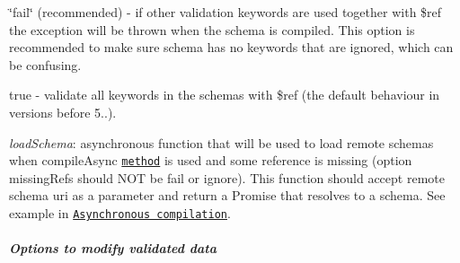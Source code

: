 \begin{DoxyItemize}
\begin{DoxyItemize}
\item {\ttfamily \char`\"{}fail\char`\"{}} (recommended) -\/ if other validation keywords are used together with {\ttfamily \$ref} the exception will be thrown when the schema is compiled. This option is recommended to make sure schema has no keywords that are ignored, which can be confusing.
\item {\ttfamily true} -\/ validate all keywords in the schemas with {\ttfamily \$ref} (the default behaviour in versions before 5..).
\end{DoxyItemize}
\item {\itshape load\+Schema}\+: asynchronous function that will be used to load remote schemas when {\ttfamily compile\+Async} \href{#api-compileAsync}{\tt method} is used and some reference is missing (option {\ttfamily missing\+Refs} should N\+OT be \textquotesingle{}fail\textquotesingle{} or \textquotesingle{}ignore\textquotesingle{}). This function should accept remote schema uri as a parameter and return a Promise that resolves to a schema. See example in \href{#asynchronous-schema-compilation}{\tt Asynchronous compilation}.
\end{DoxyItemize}

\subparagraph*{Options to modify validated data}


